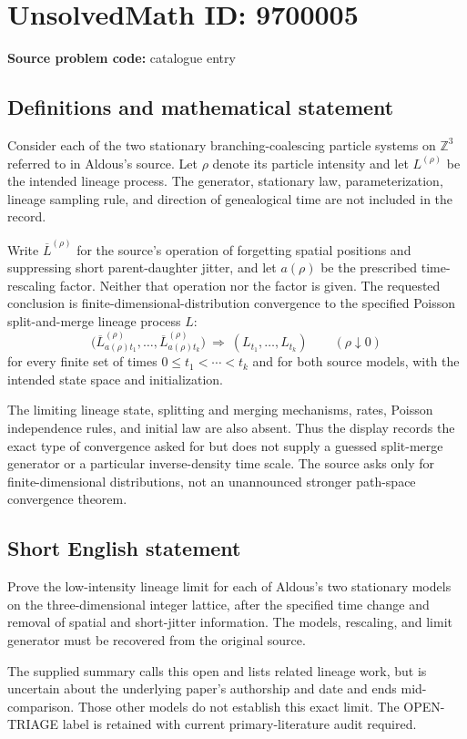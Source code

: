\documentclass[11pt]{article}
\newcommand{\Z}{\mathbb{Z}}
\begin{document}
\section*{UnsolvedMath ID: 9700005}
\textbf{Source problem code:} catalogue entry
\subsection{Definitions and mathematical statement}
Consider each of the two stationary branching-coalescing particle systems on $\Z^3$ referred to in Aldous's source. Let $\rho$ denote its particle intensity and let $L^{(\rho)}$ be the intended lineage process. The generator, stationary law, parameterization, lineage sampling rule, and direction of genealogical time are not included in the record.

Write $\overline L^{(\rho)}$ for the source's operation of forgetting spatial positions and suppressing short parent-daughter jitter, and let $a(\rho)$ be the prescribed time-rescaling factor. Neither that operation nor the factor is given. The requested conclusion is finite-dimensional-distribution convergence to the specified Poisson split-and-merge lineage process $L$:
\[
 \bigl(\overline L^{(\rho)}_{a(\rho)t_1},\ldots,
       \overline L^{(\rho)}_{a(\rho)t_k}\bigr)
 \ \Longrightarrow\ (L_{t_1},\ldots,L_{t_k})
 \qquad(\rho\downarrow0)
\]
for every finite set of times $0\le t_1<\cdots<t_k$ and for both source models, with the intended state space and initialization.

The limiting lineage state, splitting and merging mechanisms, rates, Poisson independence rules, and initial law are also absent. Thus the display records the exact type of convergence asked for but does not supply a guessed split-merge generator or a particular inverse-density time scale. The source asks only for finite-dimensional distributions, not an unannounced stronger path-space convergence theorem.
\subsection{Short English statement}
Prove the low-intensity lineage limit for each of Aldous's two stationary models on the three-dimensional integer lattice, after the specified time change and removal of spatial and short-jitter information. The models, rescaling, and limit generator must be recovered from the original source.

The supplied summary calls this open and lists related lineage work, but is uncertain about the underlying paper's authorship and date and ends mid-comparison. Those other models do not establish this exact limit. The OPEN-TRIAGE label is retained with current primary-literature audit required.
\end{document}

